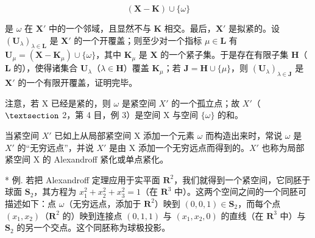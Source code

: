 \[
(\mathbf {X} - \mathbf {K}) \cup \{\omega \}
\]

是 \(\omega\) 在 \(\mathbf{X}'\) 中的一个邻域，且显然不与 \(\mathbf{K}\) 相交。最后，\(\mathbf{X}'\) 是拟紧的。设 \((\mathbf{U}_{\lambda})_{\lambda \in \mathbf{L}}\) 是 \(\mathbf{X}'\) 的一个开覆盖；则至少对一个指标 \(\mu \in \mathbf{L}\) 有 \(\mathbf{U}_{\mu} = (\mathbf{X} - \mathbf{K}_{\mu}) \cup \{\omega\}\)，其中 \(\mathbf{K}_{\mu}\) 是 \(\mathbf{X}\) 的一个紧子集。于是存在有限子集 \(\mathbf{H}\)（\(\mathbf{L}\) 的），使得诸集合 \(\mathbf{U}_{\lambda}\)（\(\lambda \in \mathbf{H}\)）覆盖 \(\mathbf{K}_{\mu}\)；若 \(\mathbf{J} = \mathbf{H} \cup \{\mu\}\)，则 \((\mathbf{U}_{\lambda})_{\lambda \in \mathbf{J}}\) 是 \(\mathbf{X}'\) 的一个有限开覆盖，证明完毕。

注意，若 X 已经是紧的，则 \(\omega\) 是紧空间 \(X'\) 的一个孤立点；故 \(X'\)（\(\S\) 2，第 4 目，例 3）是空间 X 与空间 \(\{\omega\}\) 的和。

当紧空间 \(X'\) 已如上从局部紧空间 X 添加一个元素 \(\omega\) 而构造出来时，常说 \(\omega\) 是 \(X'\) 的“无穷远点”，并说 \(X'\) 是由 X 添加一个无穷远点而得到的。\(X'\) 也称为局部紧空间 X 的 Alexandroff 紧化或单点紧化。

* 例. 若把 Alexandroff 定理应用于实平面 \(\mathbf{R}^2\)，我们就得到一个紧空间，它同胚于球面 \(\mathbf{S}_2\)，其方程为 \(x_1^2 + x_2^2 + x_3^2 = 1\)（在 \(\mathbf{R}^3\) 中）。这两个空间之间的一个同胚可描述如下：点 \(\omega\)（无穷远点，添加于 \(\mathbf{R}^2\)）映到 \((0, 0, 1) \in \mathbf{S}_2\)，而每个点 \((x_1, x_2)\)（\(\mathbf{R}^2\) 的）映到连接点 \((0, 1, 1)\) 与 \((x_1, x_2, 0)\) 的直线（在 \(\mathbf{R}^3\) 中）与 \(\mathbf{S}_2\) 的另一个交点。这个同胚称为球极投影。

